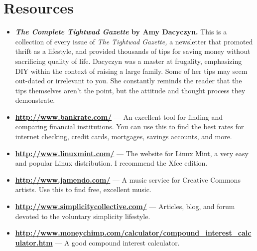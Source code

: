 \section{Resources}
\begin{itemize}
\item \textbf{\emph{The Complete Tightwad Gazette} by Amy Dacyczyn.} This is a collection of every issue of \emph{The Tightwad Gazette,} a newsletter that promoted thrift as a lifestyle, and provided thousands of tips for saving money without sacrificing quality of life. Dacyczyn was a master at frugality, emphasizing DIY within the context of raising a large family. Some of her tips may seem out-dated or irrelevant to you. She constantly reminds the reader that the tips themselves aren't the point, but the attitude and thought process they demonstrate.

\item \textbf{\url{http://www.bankrate.com/}} --- An excellent tool for finding and comparing financial institutions. You can use this to find the best rates for internet checking, credit cards, mortgages, savings accounts, and more.

\item \textbf{\url{http://www.linuxmint.com/}} --- The website for Linux Mint, a very easy and popular Linux distribution. I recommend the Xfce edition.

\item \textbf{\url{http://www.jamendo.com/}} --- A music service for Creative Commons artists. Use this to find free, excellent music.

\item \textbf{\url{http://www.simplicitycollective.com/}} --- Articles, blog, and forum devoted to the voluntary simplicity lifestyle.

\item \textbf{\url{http://www.moneychimp.com/calculator/compound\_interest\_calculator.htm}} --- A good compound interest calculator.
\end{itemize}

